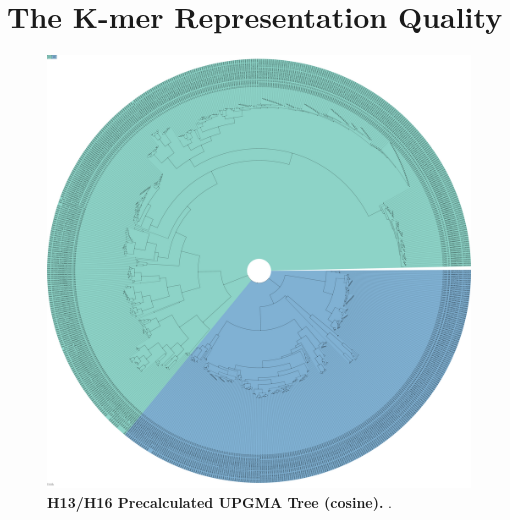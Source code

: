 \section{The K-mer Representation Quality} \label{sec:K_mer_Representation}

\blindtext




\begin{figure}[!hbt]
    \centering
    \includegraphics[width=\textwidth]{UMAP/Precalculated_Segment_4_H_Cosine.pdf}
    \caption[H13/H16 Precalculated \Acrshort{UPGMA} Tree (cosine)]{\textbf{H13/H16 Precalculated \Acrshort{UPGMA} Tree (cosine).} .}
    \label{fig:Precalculated_Cosine}
\end{figure}

